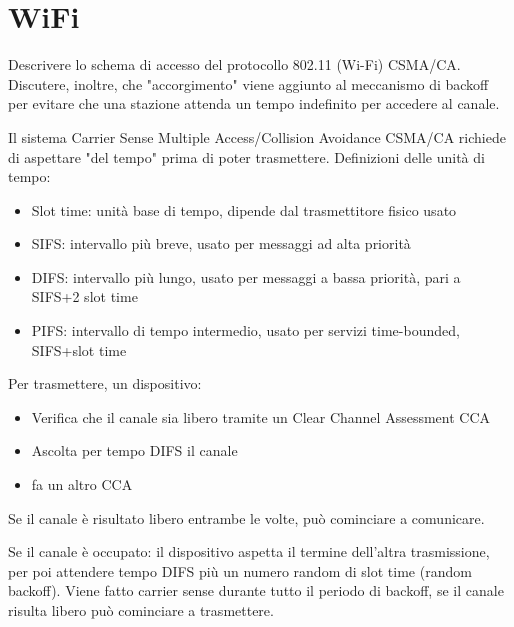 \section{WiFi}

\begin{questions}
    \question Descrivere lo schema di accesso del protocollo 802.11 (Wi-Fi) CSMA/CA. Discutere, inoltre, che "accorgimento" viene aggiunto al meccanismo di backoff per evitare che una stazione attenda un tempo indefinito per accedere al canale.
    
    \begin{solution}
        Il sistema Carrier Sense Multiple Access/Collision Avoidance CSMA/CA richiede di aspettare "del tempo" prima di poter trasmettere. Definizioni delle unità di tempo: 
        \begin{itemize}
            \item Slot time: unità base di tempo, dipende dal trasmettitore fisico usato 
            
            \item SIFS: intervallo più breve, usato per messaggi ad alta priorità
            
            \item DIFS: intervallo più lungo, usato per messaggi a bassa priorità, pari a SIFS+2 slot time
            
            \item PIFS: intervallo di tempo intermedio, usato per servizi time-bounded, SIFS+slot time
        \end{itemize}
        
        Per trasmettere, un dispositivo: 
        \begin{itemize}
            \item Verifica che il canale sia libero tramite un Clear Channel Assessment CCA
            
            \item Ascolta per tempo DIFS il canale 
            
            \item fa un altro CCA 
        \end{itemize}
        Se il canale è risultato libero entrambe le volte, può cominciare a comunicare.
        
        Se il canale è occupato: il dispositivo aspetta il termine dell'altra trasmissione, per poi attendere tempo DIFS più un numero random di slot time (random backoff). Viene fatto carrier sense durante tutto il periodo di backoff, se il canale risulta libero può cominciare a trasmettere.
        

\end{solution}
\end{questions}
